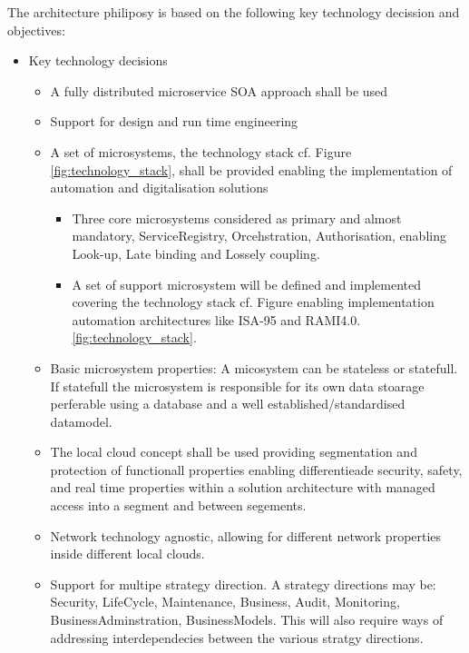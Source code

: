 \documentclass[a4paper]{arrowhead}
\begin{document}
The architecture philiposy is based on the following key technology
decission and objectives:
\begin{itemize}
\item Key technology decisions
  \begin{itemize}
  \item A fully distributed microservice SOA approach shall be used
  \item Support for design and run time engineering

  \item A set of microsystems, the technology stack cf. Figure
    \ref{fig:technology_stack}, shall be provided enabling the
    implementation of automation and digitalisation solutions
    
    \begin{itemize}
    \item Three core microsystems considered as primary and almost
      mandatory, ServiceRegistry, Orcehstration, Authorisation,
      enabling Look-up, Late binding and Lossely coupling.
    \item A set of support microsystem will be defined and implemented
      covering the technology stack cf. Figure enabling implementation
      automation architectures like ISA-95 and RAMI4.0. 
      \ref{fig:technology_stack}.
      \end{itemize}

    \item Basic microsystem properties: A micosystem can be stateless
      or statefull. If statefull the microsystem is responsible for
      its own data stoarage perferable using a database and a well
      established/standardised datamodel.

    \item The local cloud concept shall be used providing segmentation
      and protection of functionall properties enabling differentieade
      security, safety, and real time properties within a solution
      architecture with managed access into a segment and between segements.

    \item Network technology agnostic, allowing for different network
      properties inside different local clouds.

    
    \item Support for multipe strategy direction. A strategy
      directions may be: Security, LifeCycle, Maintenance, Business,
      Audit, Monitoring, BusinessAdminstration, BusinessModels. This
      will also require ways of addressing interdependecies between
      the various stratgy directions.
      

\end{itemize}
\end{itemize}
\end{document}
